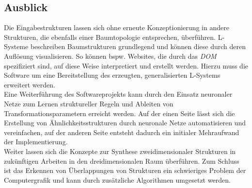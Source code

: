 \subsection*{Ausblick}
Die Eingabestrukturen lassen sich ohne erneute Konzeptionierung in andere Strukturen, die ebenfalls
einer Baumtopologie entsprechen, überführen.
L-Systeme beschreiben Baumstrukturen grundlegend und können diese durch deren Auflösung visualisieren.
So können bspw. Websites, die durch das \textit{DOM} spezifiziert sind, auf diese Weise interpretiert
und erstellt werden.
Hierzu muss die Software um eine Bereitstellung des erzeugten, generalisierten L-Systems erweitert
werden.\\
Eine Weiterführung des Softwareprojekts kann durch den Einsatz neuronaler Netze zum Lernen
struktureller Regeln und Ableiten von Transformationsparametern erreicht werden.
Auf der einen Seite lässt sich die Erstellung von Ähnlichkeitsstrukturen durch neuronale Netze
automatisieren und vereinfachen, auf der anderen Seite entsteht dadurch ein initialer Mehraufwand
der Implementierung.\\
Weiter lassen sich die Konzepte zur Synthese zweidimensionaler Strukturen in zukünftigen Arbeiten
in den dreidimensionalen Raum überführen.
Zum Schluss ist das Erkennen von Überlappungen von Strukturen ein schwieriges Problem der
Computergrafik und kann durch zusätzliche Algorithmen umgesetzt werden.